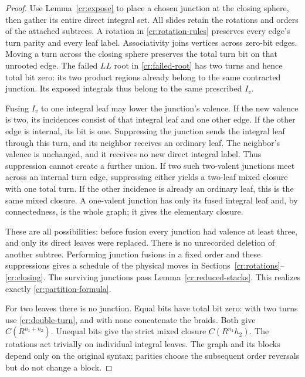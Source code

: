 \begin{proof}
Use Lemma~\ref{cr:expose} to place a chosen junction at the closing sphere, then gather its entire direct integral set. All slides retain the rotations and orders of the attached subtrees. A rotation in \eqref{cr:rotation-rules} preserves every edge's turn parity and every leaf label. Associativity joins vertices across zero-bit edges. Moving a turn across the closing sphere preserves the total turn bit on that unrooted edge. The failed $LL$ root in \eqref{cr:failed-root} has two turns and hence total bit zero: its two product regions already belong to the same contracted junction. Its exposed integrals thus belong to the same prescribed $I_v$.

Fusing $I_v$ to one integral leaf may lower the junction's valence. If the new valence is two, its incidences consist of that integral leaf and one other edge. If the other edge is internal, its bit is one. Suppressing the junction sends the integral leaf through this turn, and its neighbor receives an ordinary leaf. The neighbor's valence is unchanged, and it receives no new direct integral label. Thus suppression cannot create a further union. If two such two-valent junctions meet across an internal turn edge, suppressing either yields a two-leaf mixed closure with one total turn. If the other incidence is already an ordinary leaf, this is the same mixed closure. A one-valent junction has only its fused integral leaf and, by connectedness, is the whole graph; it gives the elementary closure.

These are all possibilities: before fusion every junction had valence at least three, and only its direct leaves were replaced. There is no unrecorded deletion of another subtree. Performing junction fusions in a fixed order and these suppressions gives a schedule of the physical moves in Sections~\ref{cr:rotations}--\ref{cr:closing}. The surviving junctions pass Lemma~\ref{cr:reduced-stacks}. This realizes exactly \eqref{cr:partition-formula}.

For two leaves there is no junction. Equal bits have total bit zero: with two turns use \eqref{cr:double-turn}, and with none concatenate the braids. Both give $C(R^{n_1+n_2})$. Unequal bits give the strict mixed closure $C(R^{n_1}h_2)$. The rotations act trivially on individual integral leaves. The graph and its blocks depend only on the original syntax; parities choose the subsequent order reversals but do not change a block.
\end{proof}

